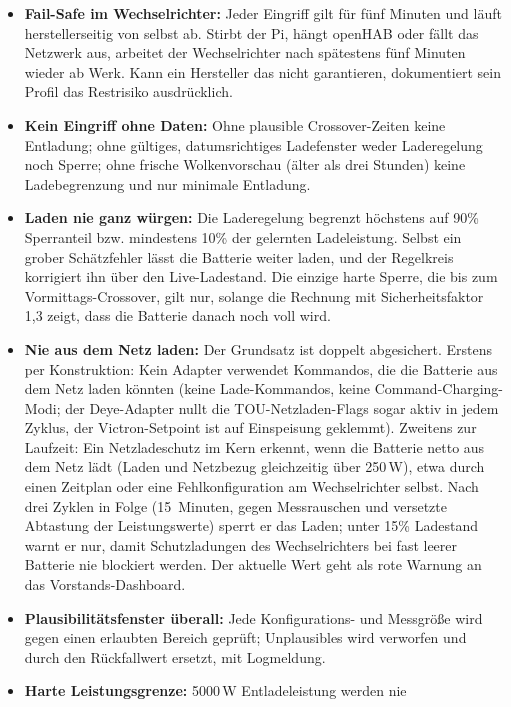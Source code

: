 \documentclass[11pt,a4paper]{article}
\begin{document}
\begin{itemize}
  \item \textbf{Fail-Safe im Wechselrichter:} Jeder Eingriff gilt für fünf
    Minuten und läuft herstellerseitig von selbst ab. Stirbt der Pi, hängt
    openHAB oder fällt das Netzwerk aus, arbeitet der Wechselrichter nach
    spätestens fünf Minuten wieder ab Werk. Kann ein Hersteller das nicht
    garantieren, dokumentiert sein Profil das Restrisiko ausdrücklich.
  \item \textbf{Kein Eingriff ohne Daten:} Ohne plausible Crossover-Zeiten
    keine Entladung; ohne gültiges, datumsrichtiges Ladefenster weder
    Laderegelung noch Sperre; ohne frische Wolkenvorschau (älter als drei
    Stunden) keine Ladebegrenzung und nur minimale Entladung.
  \item \textbf{Laden nie ganz würgen:} Die Laderegelung begrenzt höchstens
    auf 90\% Sperranteil bzw. mindestens 10\% der gelernten Ladeleistung.
    Selbst ein grober Schätzfehler lässt die Batterie weiter laden, und der
    Regelkreis korrigiert ihn über den Live-Ladestand. Die einzige harte
    Sperre, die bis zum Vormittags-Crossover, gilt nur, solange die
    Rechnung mit Sicherheitsfaktor 1,3 zeigt, dass die Batterie danach noch
    voll wird.
  \item \textbf{Nie aus dem Netz laden:} Der Grundsatz ist doppelt
    abgesichert. Erstens per Konstruktion: Kein Adapter verwendet Kommandos,
    die die Batterie aus dem Netz laden könnten (keine Lade-Kommandos,
    keine Command-Charging-Modi; der Deye-Adapter nullt die
    TOU-Netzladen-Flags sogar aktiv in jedem Zyklus, der Victron-Setpoint
    ist auf Einspeisung geklemmt). Zweitens zur Laufzeit: Ein
    Netzladeschutz im Kern erkennt, wenn die Batterie netto aus dem Netz
    lädt (Laden und Netzbezug gleichzeitig über 250\,W), etwa durch einen
    Zeitplan oder eine Fehlkonfiguration am Wechselrichter selbst. Nach
    drei Zyklen in Folge (15~Minuten, gegen Messrauschen und versetzte
    Abtastung der Leistungswerte) sperrt er das Laden; unter 15\%
    Ladestand warnt er nur, damit Schutzladungen des Wechselrichters bei
    fast leerer Batterie nie blockiert werden. Der aktuelle Wert geht als
    rote Warnung an das Vorstands-Dashboard.
  \item \textbf{Plausibilitätsfenster überall:} Jede Konfigurations- und
    Messgröße wird gegen einen erlaubten Bereich geprüft; Unplausibles wird
    verworfen und durch den Rückfallwert ersetzt, mit Logmeldung.
  \item \textbf{Harte Leistungsgrenze:} 5000\,W Entladeleistung werden nie

\end{itemize}
\end{document}
